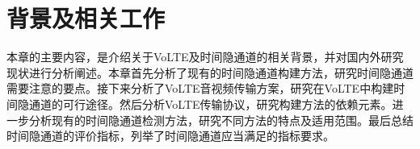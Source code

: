 \chapter{背景及相关工作}
\label{chap:backinfo}

本章的主要内容，是介绍关于VoLTE及时间隐通道的相关背景，并对国内外研究现状进行分析阐述。本章首先分析了现有的时间隐通道构建方法，研究时间隐通道需要注意的要点。接下来分析了VoLTE音视频传输方案，研究在VoLTE中构建时间隐通道的可行途径。然后分析VoLTE传输协议，研究构建方法的依赖元素。进一步分析现有的时间隐通道检测方法，研究不同方法的特点及适用范围。最后总结时间隐通道的评价指标，列举了时间隐通道应当满足的指标要求。


